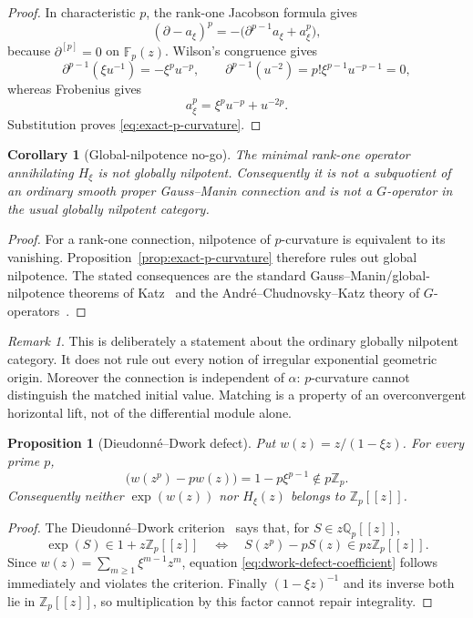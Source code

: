 \documentclass[11pt]{article}
\newtheorem{proposition}[theorem]{Proposition}
\newtheorem{corollary}[theorem]{Corollary}
\theoremstyle{definition}
\theoremstyle{remark}
\newtheorem{remark}[theorem]{Remark}
\begin{document}
\begin{proof}
In characteristic $p$, the rank-one Jacobson formula gives
\[
 (\partial-a_\xi)^p
 =-\bigl(\partial^{p-1}a_\xi+a_\xi^p\bigr),
\]
because $\partial^{[p]}=0$ on $\mathbb F_p(z)$.  Wilson's congruence gives
\[
 \partial^{p-1}(\xi u^{-1})=-\xi^pu^{-p},
 \qquad
 \partial^{p-1}(u^{-2})=p!\xi^{p-1}u^{-p-1}=0,
\]
whereas Frobenius gives
\[
 a_\xi^p=\xi^pu^{-p}+u^{-2p}.
\]
Substitution proves \eqref{eq:exact-p-curvature}.
\end{proof}

\begin{corollary}[Global-nilpotence no-go]
\label{cor:global-nilpotence-no-go}
The minimal rank-one operator annihilating $H_\xi$ is not globally
nilpotent.  Consequently it is not a subquotient of an ordinary smooth
proper Gauss--Manin connection and is not a $G$-operator in the usual
globally nilpotent category.
\end{corollary}

\begin{proof}
For a rank-one connection, nilpotence of $p$-curvature is equivalent to its
vanishing.  Proposition~\ref{prop:exact-p-curvature} therefore rules out
global nilpotence.  The stated consequences are the standard
Gauss--Manin/global-nilpotence theorems of Katz~\cite{Katz1970} and the
Andr\'e--Chudnovsky--Katz theory of $G$-operators~\cite{Andre1989}.
\end{proof}

\begin{remark}
This is deliberately a statement about the ordinary globally nilpotent
category.  It does not rule out every notion of irregular exponential
geometric origin.  Moreover the connection is independent of $\alpha$:
$p$-curvature cannot distinguish the matched initial value.  Matching is a
property of an overconvergent horizontal lift, not of the differential
module alone.
\end{remark}

\begin{proposition}[Dieudonn\'e--Dwork defect]
\label{prop:dwork-defect}
Put $w(z)=z/(1-\xi z)$.  For every prime $p$,
\begin{equation}
 [z^p]\bigl(w(z^p)-pw(z)\bigr)=1-p\xi^{p-1}\notin p\mathbb Z_p.
\label{eq:dwork-defect-coefficient}
\end{equation}
Consequently neither $\exp(w(z))$ nor $H_\xi(z)$ belongs to
$\mathbb Z_p[[z]]$.
\end{proposition}

\begin{proof}
The Dieudonn\'e--Dwork criterion~\cite{Dieudonne1957} says that, for
$S\in z\mathbb Q_p[[z]]$,
\[
 \exp(S)\in1+z\mathbb Z_p[[z]]
 \quad\Longleftrightarrow\quad
 S(z^p)-pS(z)\in pz\mathbb Z_p[[z]].
\]
Since $w(z)=\sum_{m\geq1}\xi^{m-1}z^m$, equation
\eqref{eq:dwork-defect-coefficient} follows immediately and violates the
criterion.  Finally $(1-\xi z)^{-1}$ and its inverse both lie in
$\mathbb Z_p[[z]]$, so multiplication by this factor cannot repair
integrality.
\end{proof}
\end{document}
